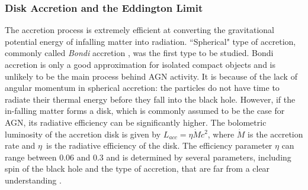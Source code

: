 \subsubsection{Disk Accretion and the Eddington Limit\label{subsec:accretion}}
The accretion process is extremely efficient at converting the gravitational potential energy of infalling matter into radiation. ``Spherical" type of accretion, commonly called \textit{Bondi} accretion \citep{bondi1952spherically},  was the first type to be studied. Bondi accretion is only a good approximation for isolated compact objects and is unlikely to be the main process behind AGN activity. It is because of the lack of angular momentum in spherical accretion: the particles do not have time to radiate their thermal energy before they fall into the black hole. However, if the in-falling matter forms a disk, which is commonly assumed to be the case for AGN, its radiative efficiency can be significantly higher. The bolometric luminosity of the accretion disk is given by $L_{acc}=\eta\dot{M}c^2$, where $\dot{M}$ is the accretion rate and $\eta$~is the radiative efficiency of the disk. The efficiency parameter $\eta$ can range between 0.06 and 0.3 and is determined by several parameters, including spin of the black hole and the type of accretion, that are far from a clear understanding \citep{raimundo2009eddington}.

